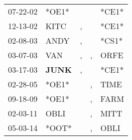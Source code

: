 \begin{supertabular}{p{0.07\textwidth}p{0.06\textwidth}p{0.02\textwidth}p{0.02\textwidth}p{0.06\textwidth}}
 07-22-02\textsuperscript{} &                            *OE1* &               &               &                   *CE1* \\
 12-13-02\textsuperscript{} &           KITC\textsuperscript{} &             , &               &                   *CE1* \\
 02-08-03\textsuperscript{} &           ANDY\textsuperscript{} &             , &               &                   *CS1* \\
 03-07-03\textsuperscript{} &            VAN\textsuperscript{} &             , &             , &  ORFE\textsuperscript{} \\
 03-17-03\textsuperscript{} &  \textbf{JUNK\textsuperscript{}} &             , &               &                   *CE1* \\
 02-28-05\textsuperscript{} &                            *OE1* &               &             , &  TIME\textsuperscript{} \\
 09-18-09\textsuperscript{} &                            *OE1* &               &             , &  FARM\textsuperscript{} \\
 02-03-11\textsuperscript{} &           OBLI\textsuperscript{} &               &             , &  MITT\textsuperscript{} \\
 05-03-14\textsuperscript{} &                            *OOT* &               &             , &  OBLI\textsuperscript{} \\
\end{supertabular}
